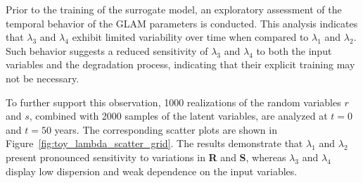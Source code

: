 Prior to the training of the surrogate model, an exploratory assessment of the temporal behavior of the GLAM parameters is conducted. This analysis indicates that $\lambda_3$ and $\lambda_4$ exhibit limited variability over time when compared to $\lambda_1$ and $\lambda_2$. Such behavior suggests a reduced sensitivity of $\lambda_3$ and $\lambda_4$ to both the input variables and the degradation process, indicating that their explicit training may not be necessary.

To further support this observation, 1000 realizations of the random variables $r$ and $s$, combined with 2000 samples of the latent variables, are analyzed at $t = 0$ and $t = 50$ years. The corresponding scatter plots are shown in Figure~\ref{fig:toy_lambda_scatter_grid}. The results demonstrate that $\lambda_1$ and $\lambda_2$ present pronounced sensitivity to variations in \textbf{R} and \textbf{S}, whereas $\lambda_3$ and $\lambda_4$ display low dispersion and weak dependence on the input variables.

